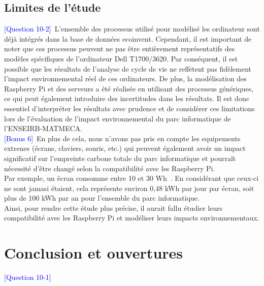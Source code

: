 \documentclass[12pt,a4paper]{paper}
\begin{document}
\subsection{Limites de l'étude}
\textcolor{blue}{[Question 10-2]}~L'ensemble des processus utilisé pour modélisé les ordinateur sont déjà intégrés dans la base de données ecoinvent. Cependant, il est important de noter que ces processus peuvent ne pas être entièrement représentatifs des modèles spécifiques de l'ordinateur Dell T1700/3620. Par conséquent, il est possible que les résultats de l'analyse de cycle de vie ne reflètent pas fidèlement l'impact environnemental réel de ces ordinateurs. De plus, la modélisation des Raspberry Pi et des serveurs a été réalisée en utilisant des processus génériques, ce qui peut également introduire des incertitudes dans les résultats. Il est donc essentiel d'interpréter les résultats avec prudence et de considérer ces limitations lors de l'évaluation de l'impact environnemental du parc informatique de l'ENSEIRB-MATMECA.\\
\textcolor{blue}{[Bonus 6]}~En plus de cela, nous n'avons pas pris en compte les equipements extrenes (écrans, claviers, souris, etc.) qui peuvent également avoir un impact significatif sur l'empreinte carbone totale du parc informatique et pourraît nécessité d'être changé selon la compatibilité avec les Raspberry Pi. \\
Par exemple, un écran consomme entre 10 et 30 Wh~\cite{maitriserenergie2024}. En considérant que ceux-ci ne sont jamasi étaient, cela représente environ 0,48 kWh par jour par écran, soit plus de 100 kWh par an pour l'ensemble du parc informatique. \\
Ainsi, pour rendre cette étude plus précise, il aurait fallu étudier leurs compatibilité avec les Raspberry Pi et modéliser leurs impacts environnementaux.


\section{Conclusion et ouvertures}
\textcolor{blue}{[Question 10-1]}~\textcolor{gray}{\lipsum[1-2] }
% 

\printbibliography
{}
% 

\appendix
\end{document}
